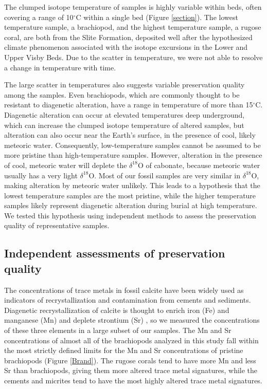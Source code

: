 \documentclass{article}
\newcommand{\deltao}{$\delta^{18}$}
\newcommand{\degrees}{$^{\circ}$}
\begin{document}
The clumped isotope temperature of samples is highly variable within beds, often covering a range of 10\degrees C within a single bed (Figure \ref{section}). The lowest temperature sample, a brachiopod, and the highest temperature sample, a rugose coral, are both from the Slite Formation, deposited well after the hypothesized climate phenomenon associated with the isotope excursions in the Lower and Upper Visby Beds. Due to the scatter in temperature, we were not able to resolve a change in temperature with time. 

The large scatter in temperatures also suggests variable preservation quality among the samples. Even brachiopods, which are commonly thought to be resistant to diagenetic alteration, have a range in temperature of more than 15\degrees C. Diagenetic alteration can occur at elevated temperatures deep underground, which can increase the clumped isotope temperature of altered samples, but alteration can also occur near the Earth's surface, in the presence of cool, likely meteoric water. Consequently, low-temperature samples cannot be assumed to be more pristine than high-temperature samples. However, alteration in the presence of cool, meteoric water will deplete the \deltao O of cabonate, because meteoric water usually has a very light \deltao O. Most of our fossil samples are very similar in \deltao O, making alteration by meteoric water unlikely. This leads to a hypothesis that the lowest temperature samples are the most pristine, while the higher temperature samples likely represent diagenetic alteration during burial at high temperature. We tested this hypothesis using independent methods to assess the preservation quality of representative samples. 

\subsection{Independent assessments of preservation quality}

The concentrations of trace metals in fossil calcite have been widely used as indicators of recrystallization and contamination from cements and sediments. Diagenetic recrystallization of calcite is thought to enrich iron (Fe) and manganese (Mn) and deplete strontium (Sr) \citep{Brand1980,Shields2003}, so we measured the concentrations of these three elements in a large subset of our samples. The Mn and Sr concentrations of almost all of the brachiopods analyzed in this study fall within the most strictly defined limits for the Mn and Sr concentrations of pristine brachiopods (Figure \ref{Brand}). The rugose corals tend to have more Mn and less Sr than brachiopods, giving them more altered trace metal signatures, while the cements and micrites tend to have the most highly altered trace metal signatures. 
\end{document}
